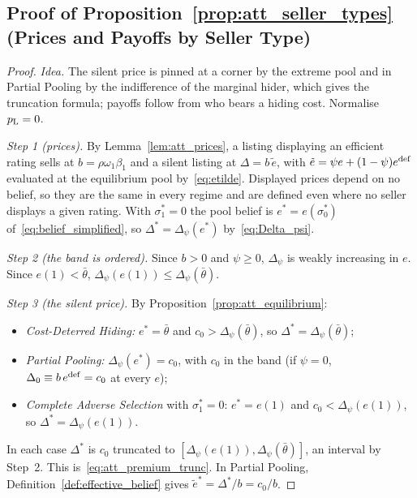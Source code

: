 \subsection*{Proof of Proposition~\ref{prop:att_seller_types} (Prices and Payoffs by Seller Type)}

\begin{proof}\upshape
\emph{Idea.} The silent price is pinned at a corner by the extreme pool and in Partial Pooling by the indifference of the marginal hider, which gives the truncation formula; payoffs follow from who bears a hiding cost. Normalise $p_{\rm L}=0$.

\emph{Step 1 (prices).} By Lemma~\ref{lem:att_prices}, a listing displaying an efficient rating sells at $b=\rho\omega_1\beta_1$ and a silent listing at $\Delta=b\,\tilde e$, with $\tilde e=\psi e+(1-\psi)e^{\rm def}$ evaluated at the equilibrium pool by~\eqref{eq:etilde}. Displayed prices depend on no belief, so they are the same in every regime and are defined even where no seller displays a given rating. With $\sigma_1^*=0$ the pool belief is $e^*=e(\sigma_0^*)$ of~\eqref{eq:belief_simplified}, so $\Delta^*=\Delta_\psi(e^*)$ by~\eqref{eq:Delta_psi}.

\emph{Step 2 (the band is ordered).} Since $b>0$ and $\psi\ge0$, $\Delta_\psi$ is weakly increasing in $e$. Since $e(1)<\bar\theta$, $\Delta_\psi(e(1))\le\Delta_\psi(\bar\theta)$.

\emph{Step 3 (the silent price).} By Proposition~\ref{prop:att_equilibrium}:
\begin{itemize}
    \item \emph{Cost-Deterred Hiding:} $e^*=\bar\theta$ and $c_0>\Delta_\psi(\bar\theta)$, so $\Delta^*=\Delta_\psi(\bar\theta)$;
    \item \emph{Partial Pooling:} $\Delta_\psi(e^*)=c_0$, with $c_0$ in the band (if $\psi=0$, $\Delta_0\equiv b\,e^{\rm def}=c_0$ at every $e$);
    \item \emph{Complete Adverse Selection} with $\sigma_1^*=0$: $e^*=e(1)$ and $c_0<\Delta_\psi(e(1))$, so $\Delta^*=\Delta_\psi(e(1))$.
\end{itemize}
In each case $\Delta^*$ is $c_0$ truncated to $[\Delta_\psi(e(1)),\Delta_\psi(\bar\theta)]$, an interval by Step~2. This is~\eqref{eq:att_premium_trunc}. In Partial Pooling, Definition~\ref{def:effective_belief} gives $\tilde e^*=\Delta^*/b=c_0/b$.


\end{proof}
